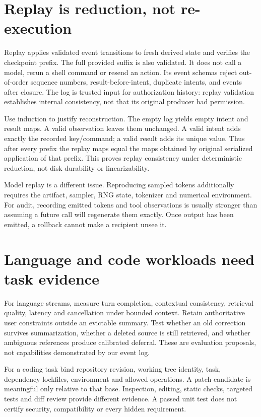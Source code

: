 \section{Replay is reduction, not re-execution}
Replay applies validated event transitions to fresh derived state and verifies
the checkpoint prefix. The full provided suffix is also validated. It does
not call a model, rerun a shell command or resend an action. Its event schemas
reject out-of-order sequence numbers, result-before-intent, duplicate intents,
and events after closure. The log is trusted input for authorization history:
replay validation establishes internal consistency, not that its original
producer had permission.

Use induction to justify reconstruction. The empty log yields empty intent
and result maps. A valid observation leaves them unchanged. A valid intent
adds exactly the recorded key/command; a valid result adds its unique value.
Thus after every prefix the replay maps equal the maps obtained by original
serialized application of that prefix. This proves replay consistency under
deterministic reduction, not disk durability or linearizability.

Model replay is a different issue. Reproducing sampled tokens additionally
requires the artifact, sampler, RNG state, tokenizer and numerical environment.
For audit, recording emitted tokens and tool observations is usually stronger
than assuming a future call will regenerate them exactly. Once output has been
emitted, a rollback cannot make a recipient unsee it.

\section{Language and code workloads need task evidence}
For language streams, measure turn completion, contextual consistency,
retrieval quality, latency and cancellation under bounded context. Retain
authoritative user constraints outside an evictable summary. Test whether an
old correction survives summarization, whether a deleted source is still
retrieved, and whether ambiguous references produce calibrated deferral.
These are evaluation proposals, not capabilities demonstrated by our event log.

For a coding task bind repository revision, working tree identity, task,
dependency lockfiles, environment and allowed operations. A patch candidate
is meaningful only relative to that base. Inspection, editing, static checks,
targeted tests and diff review provide different evidence. A passed unit test
does not certify security, compatibility or every hidden requirement.


